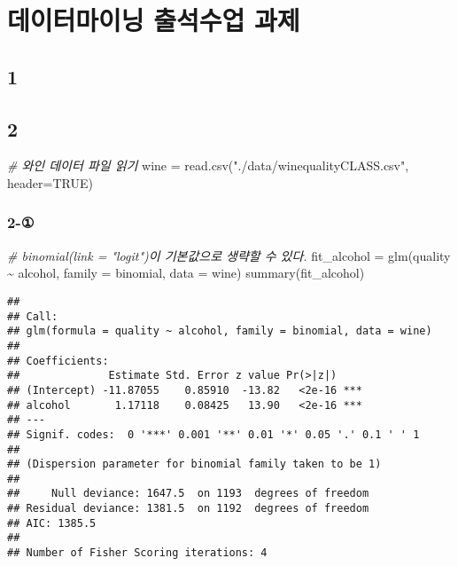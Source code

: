 \documentclass[
]{article}
\author{}
\date{\vspace{-2.5em}}
\newenvironment{Shaded}{\begin{snugshade}}{\end{snugshade}}
\newcommand{\AttributeTok}[1]{\textcolor[rgb]{0.77,0.63,0.00}{#1}}
\newcommand{\CommentTok}[1]{\textcolor[rgb]{0.56,0.35,0.01}{\textit{#1}}}
\newcommand{\ConstantTok}[1]{\textcolor[rgb]{0.00,0.00,0.00}{#1}}
\newcommand{\FunctionTok}[1]{\textcolor[rgb]{0.00,0.00,0.00}{#1}}
\newcommand{\NormalTok}[1]{#1}
\newcommand{\OtherTok}[1]{\textcolor[rgb]{0.56,0.35,0.01}{#1}}
\newcommand{\SpecialCharTok}[1]{\textcolor[rgb]{0.00,0.00,0.00}{#1}}
\newcommand{\StringTok}[1]{\textcolor[rgb]{0.31,0.60,0.02}{#1}}
\begin{document}
\hypertarget{uxb370uxc774uxd130uxb9c8uxc774uxb2dd-uxcd9cuxc11duxc218uxc5c5-uxacfcuxc81c}{%
\section{데이터마이닝 출석수업
과제}\label{uxb370uxc774uxd130uxb9c8uxc774uxb2dd-uxcd9cuxc11duxc218uxc5c5-uxacfcuxc81c}}

\hypertarget{section}{%
\subsection{1}\label{section}}

\hypertarget{section-1}{%
\subsection{2}\label{section-1}}

\begin{Shaded}
\begin{Highlighting}[]
\CommentTok{\# 와인 데이터 파일 읽기}
\NormalTok{wine }\OtherTok{=} \FunctionTok{read.csv}\NormalTok{(}\StringTok{"./data/winequalityCLASS.csv"}\NormalTok{, }\AttributeTok{header=}\ConstantTok{TRUE}\NormalTok{)}
\end{Highlighting}
\end{Shaded}

\hypertarget{section-2}{%
\subsubsection{2-①}\label{section-2}}

\begin{Shaded}
\begin{Highlighting}[]
\CommentTok{\# binomial(link = "logit")이 기본값으로 생략할 수 있다.}
\NormalTok{fit\_alcohol }\OtherTok{=} \FunctionTok{glm}\NormalTok{(quality }\SpecialCharTok{\textasciitilde{}}\NormalTok{ alcohol, }\AttributeTok{family =}\NormalTok{ binomial, }\AttributeTok{data =}\NormalTok{ wine)}
\FunctionTok{summary}\NormalTok{(fit\_alcohol)}
\end{Highlighting}
\end{Shaded}

\begin{verbatim}
## 
## Call:
## glm(formula = quality ~ alcohol, family = binomial, data = wine)
## 
## Coefficients:
##              Estimate Std. Error z value Pr(>|z|)    
## (Intercept) -11.87055    0.85910  -13.82   <2e-16 ***
## alcohol       1.17118    0.08425   13.90   <2e-16 ***
## ---
## Signif. codes:  0 '***' 0.001 '**' 0.01 '*' 0.05 '.' 0.1 ' ' 1
## 
## (Dispersion parameter for binomial family taken to be 1)
## 
##     Null deviance: 1647.5  on 1193  degrees of freedom
## Residual deviance: 1381.5  on 1192  degrees of freedom
## AIC: 1385.5
## 
## Number of Fisher Scoring iterations: 4
\end{verbatim}
\end{document}
